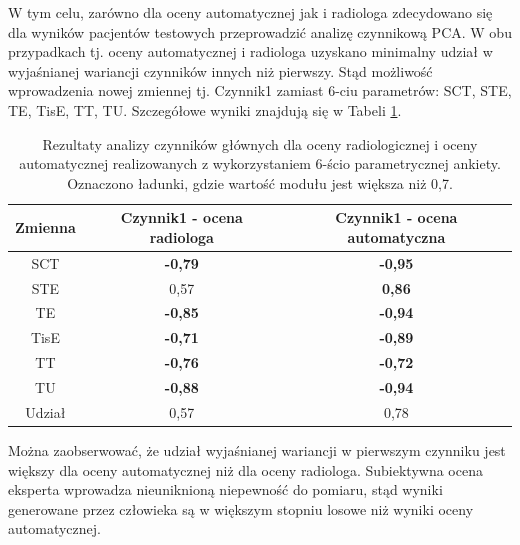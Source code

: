 W tym celu, zarówno dla oceny automatycznej jak i radiologa zdecydowano się dla wyników pacjentów testowych przeprowadzić analizę czynnikową PCA. W obu przypadkach tj. oceny automatycznej i radiologa uzyskano minimalny udział w wyjaśnianej wariancji czynników innych niż pierwszy. Stąd możliwość wprowadzenia nowej zmiennej tj. Czynnik1 zamiast 6-ciu parametrów: SCT, STE, TE, TisE, TT, TU. Szczegółowe wyniki znajdują się w Tabeli \ref{tab:pca-gt-pred}.

\begin{table}[t!]
	\centering
	\setlength{\tabcolsep}{3pt}
	\setlength\extrarowheight{2pt}
	\caption{Rezultaty analizy czynników głównych dla oceny radiologicznej i oceny automatycznej realizowanych z wykorzystaniem 6-ścio parametrycznej ankiety. Oznaczono ładunki, gdzie wartość modułu jest większa niż 0,7.}
	\label{tab:pca-gt-pred}
	\begin{tabular}{c|c|c}
		Zmienna&Czynnik1 - ocena radiologa&Czynnik1 - ocena automatyczna \\
		\hline \hline
		SCT&\textbf{-0,79}&\textbf{-0,95}\\
		\hline
		STE&0,57&\textbf{0,86}\\
		\hline
		TE&\textbf{-0,85}&\textbf{-0,94}\\
		\hline
		TisE&\textbf{-0,71}&\textbf{-0,89}\\
		\hline
		TT&\textbf{-0,76}&\textbf{-0,72}\\
		\hline
		TU&\textbf{-0,88}&\textbf{-0,94}\\
		\hline \hline	
		Udział&0,57&0,78\\
		
	\end{tabular}
\end{table}

Można zaobserwować, że udział wyjaśnianej wariancji w pierwszym czynniku jest większy dla oceny automatycznej niż dla oceny radiologa. Subiektywna ocena eksperta wprowadza nieuniknioną niepewność do pomiaru, stąd wyniki generowane przez człowieka są w większym stopniu losowe niż wyniki oceny automatycznej. 

